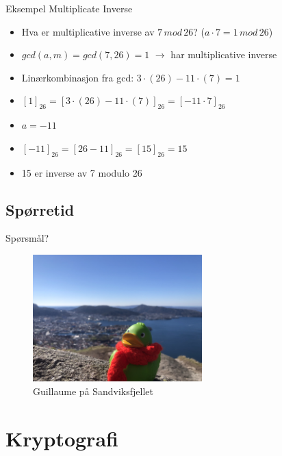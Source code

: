 \begin{frame}{Eksempel Multiplicate Inverse}
\begin{itemize}[<+->]
\item Hva er multiplicative inverse av $7\, mod\, 26$? ($a\cdot 7=1\, mod\, 26$)
\item $gcd(a,m) = gcd(7,26)=1$ $\rightarrow$ har multiplicative inverse
\item Linærkombinasjon fra gcd: $3\cdot (26)-11\cdot (7)=1$
\item $[1]_{26}=[3\cdot (26)-11\cdot (7)]_{26}=[-11\cdot 7]_{26}$
\item $a=-11$
\item $[-11]_{26}=[26-11]_{26}=[15]_{26}=15$
\item 15 er inverse av 7 modulo 26

\end{itemize}
\end{frame}

\subsection*{Spørretid}
\begin{frame}{Spørsmål?}
    \begin{figure}
        \centering
        \includegraphics[height = 4.9cm]{images/guillaume1.jpg}
        \caption{Guillaume på Sandviksfjellet}
        \label{fig:guillaume1}
    \end{figure}
\end{frame}


\section{Kryptografi}
